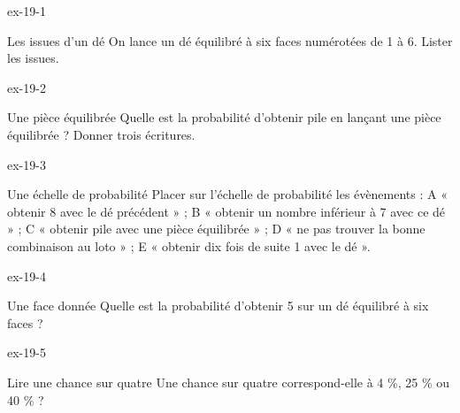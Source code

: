 \clearpage{}
\begin{blocLivre}{ex-19-1}\begin{exercice}[1]{Les issues d’un dé}
On lance un dé équilibré à six faces numérotées de 1 à 6. Lister les issues.
\end{exercice}\end{blocLivre}
\begin{blocLivre}{ex-19-2}\begin{exercice}[1]{Une pièce équilibrée}
Quelle est la probabilité d’obtenir pile en lançant une pièce équilibrée ? Donner trois écritures.
\end{exercice}\end{blocLivre}
\begin{blocLivre}{ex-19-3}\begin{exercice}[1]{Une échelle de probabilité}
Placer sur l’échelle de probabilité les évènements : A « obtenir 8 avec le dé précédent » ; B « obtenir un nombre inférieur à 7 avec ce dé » ; C « obtenir pile avec une pièce équilibrée » ; D « ne pas trouver la bonne combinaison au loto » ; E « obtenir dix fois de suite 1 avec le dé ».
\label{fig-ex-19-3}
\end{exercice}\end{blocLivre}
\begin{blocLivre}{ex-19-4}\begin{exercice}[1]{Une face donnée}
Quelle est la probabilité d’obtenir 5 sur un dé équilibré à six faces ?
\end{exercice}\end{blocLivre}
\begin{blocLivre}{ex-19-5}\begin{exercice}[1]{Lire une chance sur quatre}
Une chance sur quatre correspond-elle à 4 \%, 25 \% ou 40 \% ?
\end{exercice}\end{blocLivre}

